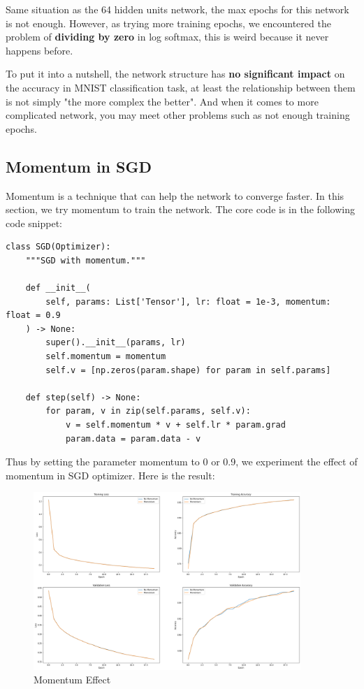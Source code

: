 \documentclass[a4paper, 11pt]{article} %
\begin{document}
Same situation as the 64 hidden units network, the max epochs for this network is not enough.
However, as trying more training epochs, we encountered the problem of \textbf{dividing by zero}
in log softmax, this is weird because it never happens before.

To put it into a nutshell, the network structure has \textbf{no significant impact} on the
accuracy in MNIST classification task, at least the relationship between them is not simply
"the more complex the better". And when it comes to more complicated network, you may meet
other problems such as not enough training epochs.

\subsection{\textbf{Momentum in SGD}}

Momentum is a technique that can help the network to converge faster. In this section, we
try momentum to train the network. The core code is in the following code snippet:

\begin{lstlisting}
class SGD(Optimizer):
    """SGD with momentum."""

    def __init__(
        self, params: List['Tensor'], lr: float = 1e-3, momentum: float = 0.9
    ) -> None:
        super().__init__(params, lr)
        self.momentum = momentum
        self.v = [np.zeros(param.shape) for param in self.params]

    def step(self) -> None:
        for param, v in zip(self.params, self.v):
            v = self.momentum * v + self.lr * param.grad
            param.data = param.data - v
\end{lstlisting}

Thus by setting the parameter momentum to 0 or 0.9, we experiment the effect of momentum in
SGD optimizer. Here is the result:

\begin{figure}[H]
    \centering
    \includegraphics[width=0.9\textwidth]{./img/momentum.png}
    \caption{Momentum Effect}
\end{figure}
\end{document}
